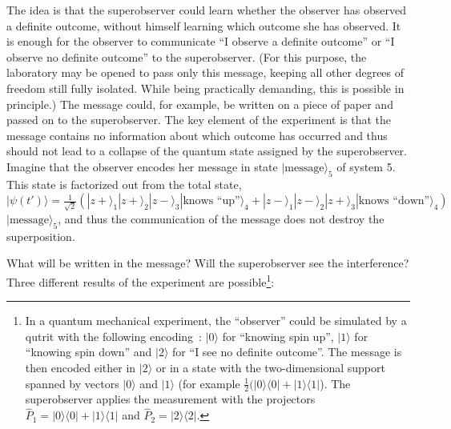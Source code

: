 \documentclass[12pt,a4]{article}
\begin{document}
The idea is that the superobserver could learn whether the observer has observed a definite outcome, without himself learning which outcome she has observed. It is enough for the observer to communicate ``I observe a definite outcome'' or ``I observe no definite outcome'' to the superobserver. (For this purpose, the laboratory may be opened to pass only this message, keeping all other degrees of freedom still fully isolated. While being practically demanding, this is possible in principle.) The message could, for example, be written on a piece of paper and passed on to the superobserver. The key element of the experiment is that the message contains no information about which outcome has occurred and thus should not lead to a collapse of the quantum state assigned by the superobserver. Imagine that the observer encodes her message in state $|\mbox{message}\rangle_5$ of system 5. This state is factorized out from the total state, $|\psi(t')\rangle = \frac{1}{\sqrt{2}} (|z+\rangle_1|z+\rangle_2|z-\rangle_3|\mbox{knows ``up''}\rangle_4 +|z-\rangle_1|z-\rangle_2|z+\rangle_3 |\mbox{knows ``down''}\rangle_4)$ $|\mbox{message}\rangle_5$, and thus the communication of the message does not destroy the superposition.

What will be written in the message? Will the superobserver see the interference? Three different results of the experiment are possible\footnote{In a quantum mechanical experiment, the ``observer'' could be simulated by a qutrit with the following encoding~\cite{bennett}: $|0\rangle$ for ``knowing spin up'', $|1\rangle$ for ``knowing spin down'' and $|2\rangle$ for ``I see no definite outcome''. The message is then encoded either in $|2\rangle$ or in a state with the two-dimensional support spanned by vectors $|0\rangle$ and $|1\rangle$ (for example $\frac{1}{2}(|0\rangle\langle 0|+|1\rangle \langle 1|$). The superobserver applies the measurement with the projectors $\hat{P}_1=|0\rangle \langle 0| + |1\rangle \langle 1|$ and $\hat{P}_2=|2\rangle \langle 2|$.}:
\end{document}
